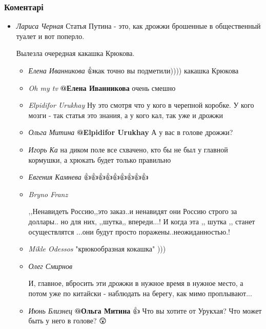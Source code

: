  
 
 
 
 
\subsubsection{Коментарі}
\label{sec:17_07_2021.youtube.sharij_anatolij.1.boty_putina_strana_izgoj.cmt}

\begin{itemize}
\item \emph{Лариса Черная}
Статья Путина - это, как дрожжи брошенные в общественный туалет и вот поперло.

Вылезла очередная какашка Крюкова.

\begin{itemize}
\item \emph{Елена Иванникова}
👍как точно вы подметили)))) какашка Крюкова🤣🤣

\item \emph{Oh my tv}
\textbf{@Елена Иванникова}  очень смешно

\item \emph{Elpidifor Urukhay}
Ну это смотря что у кого в черепной коробке. У кого мозги - так статья это знания, а у кого кал, так уже и дрожжи

\item \emph{Ольга Митина}
\textbf{@Elpidifor Urukhay}  А у вас в голове  дрожжи?

\item \emph{Игорь Ка}
на диком поле все схвачено, кто бы не был у главной кормушки, а хрюкать будет только правильно

\item \emph{Евгения Камнева}
👍👍👍👍👍👍👍👍👍

\item \emph{Bryno Franz}

,,Ненавидеть  Россию,,это заказ..и ненавидят они Россию  строго за доллары.. но
для них,  ,,шутка,, впереди...! И когда эта ,, шутка ,,  станет осуществлятся
...они будут просто поражены..неожиданностью.!

\item \emph{Mikle Odessos}
"крюкообразная кокашка" 
)))

\item \emph{Олег Смирнов}

И, главное, вбросить эти дрожжи в нужное время в нужное место, а потом уже по
китайски - наблюдать на берегу, как мимо проплывают...

\item \emph{Июнь Близнец}
\textbf{@Ольга Митина}  👍 Что вы хотите от Урукхая?  Что может быть у него в голове? 😲

\end{itemize}
\end{itemize}
